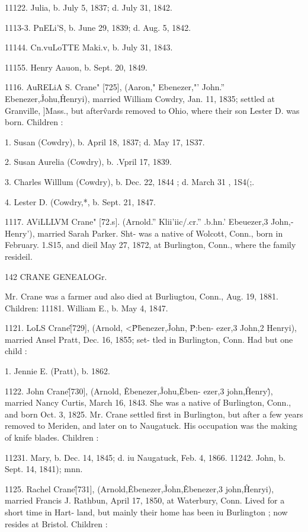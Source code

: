 11122. Julia, b. July 5, 1837; d. July 31, 1842. 

1113-3. PnELi'S, b. June 29, 1839; d. Aug. 5, 1842. 

11144. Cn.vuLoTTE Maki.v, b. July 31, 1843. 

11155. Henry Aauon, b. Sept. 20, 1849. 

1116. AuRELiA S. Crane" [725], (Aaron," Ebenezer,"' John.'' 
Ebenezer,\^ Johu,\^ Henryi), married William Cowdry, Jan. 11, 
1835; settled at Granville, ]Mass., but after\^vards removed to 
Ohio, where their son Lester D. was born. Children : 

1. Susan (Cowdry), b. April 18, 1837; d. May 17, 1S37. 

2. Susan Aurelia (Cowdry), b. .Vpril 17, 1839. 

3. Charles Willlum (Cowdry), b. Dec. 22, 1844 ; d. March 31 , 1S4(;. 

4. Lester D. (Cowdry,*, b. Sept. 21, 1847. 

1117. AViLLLVM Crane" [72.s]. (Arnold.'' Klii'iic/.cr.'' .b.hn.' 
Ebeuezer,3 John,- Henry'), married Sarah Parker. Sht- was a 
native of Wolcott, Conn., born in February. 1.S15, and dieil 
May 27, 1872, at Burlington, Conn., where the family resideil. 



142 CRANE GENEALOGr. 

Mr. Crane was a farmer aud also died at Burliugtou, Conn., Aug. 
19, 1881. Children: 
11181. William E., b. May 4, 1847. 

1121. LoLS Crane\^ [729], (Arnold, <\^ P\^benezer,\^ John, \^ P:ben- 
ezer,3 John,2 Henryi), married Ansel Pratt, Dec. 16, 1855; set- 
tled in Burlington, Conn. Had but one child : 

1. Jennie E. (Pratt), b. 1862. 

1122. John Crane\^ [730], (Arnold, \^ Ebenezer,\^ Johu,\^ Eben- 
ezer,3 john,\^ Henry\^), married Nancy Curtis, March 16, 1843. 
She was a native of Burlington, Conn., and born Oct. 3, 1825. 
Mr. Crane settled first in Burlington, but after a few years 
removed to Meriden, and later on to Naugatuck. His occupation 
was the making of knife blades. Children : 

11231. Mary, b. Dec. 14, 1845; d. iu Naugatuck, Feb. 4, 1866. 
11242. John, b. Sept. 14, 1841); mnn. 

1125. Rachel Crane\^ [731], (Arnold,\^ Ebenezer,\^ John,\^ 
Ebenezer,3 john,\^ Henryi), married Francis J. Rathbun, April 
17, 1850, at Waterbury, Conn. Lived for a short time in Hart- 
land, but mainly their home has been iu Burlington ; now resides 
at Bristol. Children : 

